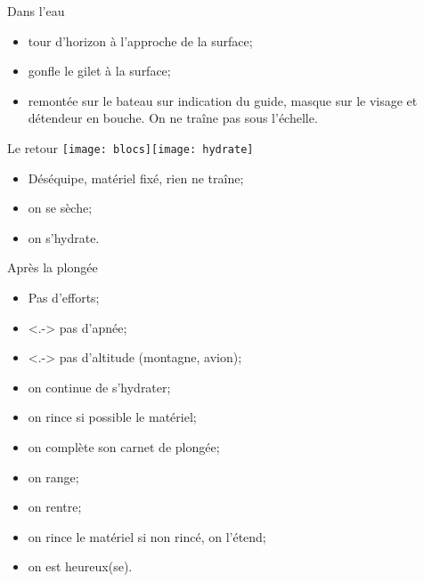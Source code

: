 \begin{frame}{Dans l'eau}
\begin{block}
\begin{itemize}[<+(7)->]
\item tour d'horizon à l'approche de la surface;
\item gonfle le gilet à la surface;
\item remontée sur le bateau sur indication du guide,
  masque sur le visage et détendeur en bouche. On ne traîne pas sous l'échelle.%
\end{itemize}%
\end{block}%
%
\end{frame}

\begin{frame}{Le retour}
\null\hfill\texttt{[image: blocs]}\hfill\texttt{[image: hydrate]}\hfill\null%
\begin{block}{}
\begin{itemize}[<+->]
\item Déséquipe, matériel fixé, rien ne traîne;
\item on se sèche;
\item on s'hydrate.
\end{itemize}
\end{block}
\end{frame}

\begin{frame}{Après la plongée}
\begin{block}{}
\begin{itemize}
\item<1-> Pas d'efforts;
\item<.-> pas d'apnée;
\item<.-> pas d'altitude (montagne, avion);
\item<2-> on continue de s'hydrater;
\item<3-> on rince si possible le matériel;
\item<3-> on complète son carnet de plongée;
\item<3-> on range;
\item<4> on rentre;
\item<4> on rince le matériel si non rincé, on l'étend;
\item<4> on est heureux(se).
\end{itemize}
\end{block}
%
%
%
%
\end{frame}
